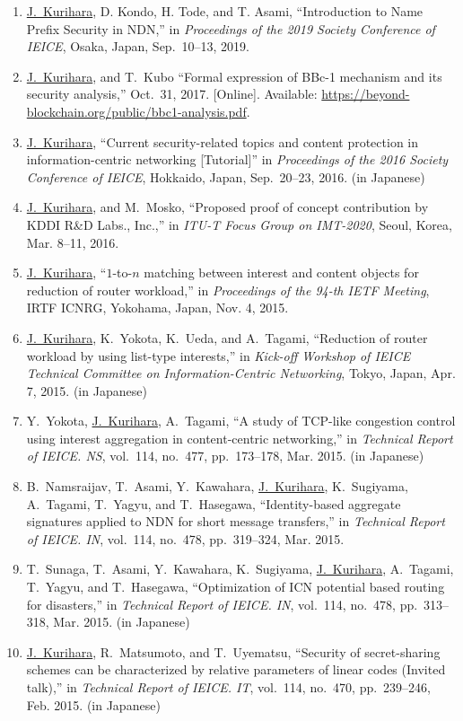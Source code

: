 \begin{enumerate}
 \item \underline{J.~Kurihara}, D. Kondo, H. Tode, and T. Asami, ``Introduction to Name Prefix Security in NDN,'' in \textit{Proceedings of the 2019 Society Conference of IEICE}, Osaka, Japan, Sep.~10--13, 2019.
 \item \underline{J.~Kurihara}, and T.~Kubo ``Formal expression of BBc-1 mechanism and its security analysis,'' Oct.~31, 2017. [Online]. Available: \url{https://beyond-blockchain.org/public/bbc1-analysis.pdf}.
 \item \underline{J.~Kurihara}, ``Current security-related topics and content protection in information-centric networking [Tutorial]'' in \textit{Proceedings of the 2016 Society Conference of IEICE}, Hokkaido, Japan, Sep.~20--23, 2016. (in Japanese)
 \item \underline{J.~Kurihara}, and M.~Mosko, ``Proposed proof of concept contribution by KDDI R\&D Labs., Inc.,'' in \textit{ITU-T Focus Group on IMT-2020}, Seoul, Korea, Mar. 8--11, 2016.
 \item \underline{J.~Kurihara}, ``$1$-to-$n$ matching between interest and content objects for reduction of router workload,'' in \textit{Proceedings of the 94-th IETF Meeting}, IRTF ICNRG, Yokohama, Japan, Nov. 4, 2015.
 \item \underline{J.~Kurihara}, K.~Yokota, K.~Ueda, and A.~Tagami, ``Reduction of router workload by using list-type interests,'' in \textit{Kick-off Workshop of IEICE Technical Committee on Information-Centric Networking}, Tokyo, Japan, Apr. 7, 2015. (in Japanese)
 \item Y.~Yokota, \underline{J.~Kurihara}, A.~Tagami, ``A study of TCP-like congestion control using interest aggregation in content-centric networking,'' in \textit{Technical Report of IEICE. NS}, vol.~114, no.~477, pp.~173--178, Mar. 2015. (in Japanese)
 \item B.~Namsraijav, T.~Asami, Y.~Kawahara, \underline{J.~Kurihara}, K.~Sugiyama, A.~Tagami, T.~Yagyu, and T.~Hasegawa, ``Identity-based aggregate signatures applied to NDN for short message transfers,'' in \textit{Technical Report of IEICE. IN}, vol.~114, no.~478, pp.~319--324, Mar. 2015.
 \item T.~Sunaga, T.~Asami, Y.~Kawahara, K.~Sugiyama, \underline{J.~Kurihara}, A.~Tagami, T.~Yagyu, and T.~Hasegawa, ``Optimization of ICN potential based routing for disasters,'' in \textit{Technical Report of IEICE. IN}, vol.~114, no.~478, pp.~313--318, Mar. 2015. (in Japanese)
 \item \underline{J.~Kurihara}, R.~Matsumoto, and T.~Uyematsu, ``Security of secret-sharing schemes can be characterized by relative parameters of linear codes (Invited talk),'' in \textit{Technical Report of IEICE. IT}, vol.~114, no.~470, pp.~239--246, Feb. 2015. (in Japanese)

\end{enumerate}

